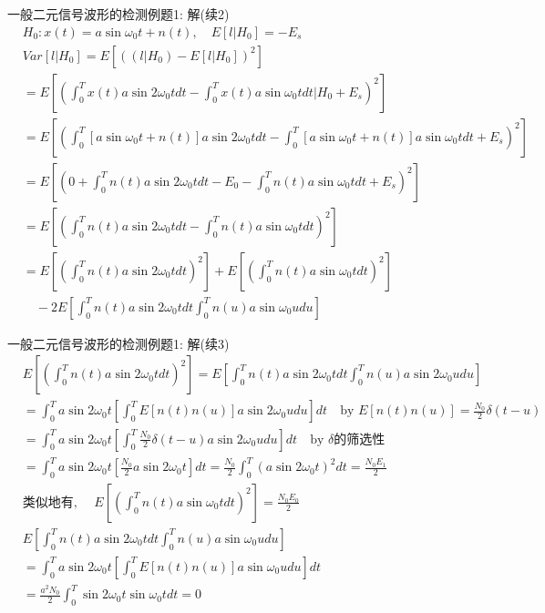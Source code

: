 \begin{frame}[shrink]{一般二元信号波形的检测例题1: 解(续2)}
\begin{align*}
&H_0: x(t)=a\sin\omega_0t+n(t),\quad E[l|H_0]=-E_s\\
&Var[l|H_0]=E\left[\left((l|H_0)-E[l|H_0]\right)^2\right]\\
&=E\left[\left(\int_{0}^{T}x(t)a\sin2\omega_0tdt-\int_{0}^{T}x(t)a\sin\omega_0tdt|H_0+E_s\right)^2\right]\\
&=E\left[\left(\int_{0}^{T}[a\sin\omega_0t+n(t)]a\sin2\omega_0tdt-\int_{0}^{T}[a\sin\omega_0t+n(t)]a\sin\omega_0tdt+E_s\right)^2\right]\\
&=E\left[\left(0+\int_{0}^{T}n(t)a\sin2\omega_0tdt-E_0-\int_{0}^{T}n(t)a\sin\omega_0tdt+E_s\right)^2\right]\\
&=E\left[\left(\int_{0}^{T}n(t)a\sin2\omega_0tdt-\int_{0}^{T}n(t)a\sin\omega_0tdt\right)^2\right]\\
&=E\left[\left(\int_{0}^{T}n(t)a\sin2\omega_0tdt\right)^2\right]+E\left[\left(\int_{0}^{T}n(t)a\sin\omega_0tdt\right)^2\right]\\
&\quad -2E\left[\int_{0}^{T}n(t)a\sin2\omega_0tdt\int_{0}^{T}n(u)a\sin\omega_0udu\right]
\end{align*}
\end{frame}

\begin{frame}[shrink]{一般二元信号波形的检测例题1: 解(续3)}
\begin{align*}
&E\left[\left(\int_{0}^{T}n(t)a\sin2\omega_0tdt\right)^2\right]=E\left[\int_{0}^{T}n(t)a\sin2\omega_0tdt\int_{0}^{T}n(u)a\sin2\omega_0udu\right]\\
&=\int_{0}^{T}a\sin2\omega_0t\left[\int_{0}^{T}E[n(t)n(u)]a\sin2\omega_0udu\right]dt\quad\text{by }E[n(t)n(u)]=\frac{N_0}{2}\delta(t-u)\\
&=\int_{0}^{T}a\sin2\omega_0t\left[\int_{0}^{T}\frac{N_0}{2}\delta(t-u)a\sin2\omega_0udu\right]dt\quad\text{by $\delta$的筛选性}\\
&=\int_{0}^{T}a\sin2\omega_0t\left[\frac{N_0}{2}a\sin2\omega_0t\right]dt=\frac{N_0}{2}\int_{0}^{T}(a\sin2\omega_0t)^2dt=\frac{N_0E_1}{2}\\
&\text{类似地有, }\quad E\left[\left(\int_{0}^{T}n(t)a\sin\omega_0tdt\right)^2\right]=\frac{N_0E_0}{2}\\
&E\left[\int_{0}^{T}n(t)a\sin2\omega_0tdt\int_{0}^{T}n(u)a\sin\omega_0udu\right]\\
&=\int_{0}^{T}a\sin2\omega_0t\left[\int_{0}^{T}E[n(t)n(u)]a\sin\omega_0udu\right]dt\\
&=\frac{a^2N_0}{2}\int_{0}^{T}\sin2\omega_0t\sin\omega_0tdt=0
\end{align*}
\end{frame}

